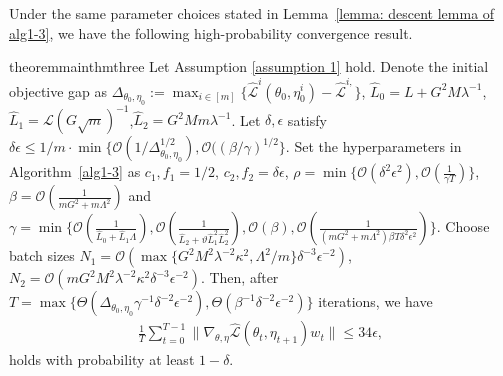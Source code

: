 \documentclass[twoside]{article} %
\theoremstyle{plain}
\theoremstyle{definition}
\theoremstyle{remark}
\newcommand{\hL}{\hat{L}}
\newcommand{\fL}{\mathcal{L}}
\newcommand{\fhL}{\hat{\mathcal{L}}}
\begin{document}
Under the same parameter choices stated in Lemma~\ref{lemma: descent lemma of alg1-3}, we have the following high-probability convergence result.
\begin{restatable}{theorem}{mainthmthree}\label{restatethm: convergence of alg3}
     Let Assumption \ref{assumption 1} hold. Denote the initial objective gap as $\Delta_{\theta_0,\eta_0}
    := \max_{i\in[m]}\{\fhL^i(\theta_0,\eta_0^i)-\fhL^{i,} \}$,  $\hL_0=L+G^2M\lambda^{-1}$,$\hL_1=\fL(G\sqrt{m})^{-1}$,$\hL_2=G^2Mm\lambda^{-1}$.
     Let $\delta,\epsilon$ satisfy $\delta\epsilon\leq 1/m\cdot\min\{\mathcal{O}({1}/{\Delta_{\theta_0,\eta_0}^{1/2}}),\mathcal{O}((\beta/\gamma)^{1/2}\}$. Set the hyperparameters in Algorithm~\ref{alg1-3} as $c_1,f_1={1}/{2}$, $c_2,f_2=\delta\epsilon$, 
    $\rho=\min\{\mathcal{O}(\delta^2\epsilon^2),\mathcal{O}(\frac{1}{\gamma T})\}$, $\beta=\mathcal{O}(\frac{1}{mG^2+m\Lambda^2})$ and $\gamma = \min\big\{ \mathcal{O}(\frac{1}{\hL_0+\hL_1\Lambda}), \mathcal{O}(\frac{1}{\hL_2+\vartheta\hL_1^2\hL_2^2}),\mathcal{O}(\beta),\mathcal{O}(\frac{1}{(mG^2+m\Lambda^2)\beta T\delta^2\epsilon^2}) \big\}$.
    Choose batch sizes $N_1=\mathcal{O}(\max\{G^2M^2\lambda^{-2}\kappa^2,\Lambda^2/m \}\delta^{-3}\epsilon^{-2})$, $N_2= \mathcal{O}(mG^2M^2\lambda^{-2}\kappa^2\delta^{-3}\epsilon^{-2})$. Then, after
    $T
    =\max\{ \Theta(\Delta_{\theta_0,\eta_0}\gamma^{-1}\delta^{-2}\epsilon^{-2}),\Theta(\beta^{-1}\delta^{-2}\epsilon^{-2})\}$ iterations, we have 
    \begin{align}
        \frac{1}{T}\sum_{t=0}^{T-1}\|\nabla_{\theta,\eta}\fhL(\theta_t, \eta_{t+1})w_t\|\leq 34\epsilon
        ,\nonumber
    \end{align}
    holds with probability at least $1-\delta$. 
\end{restatable}
\end{document}

